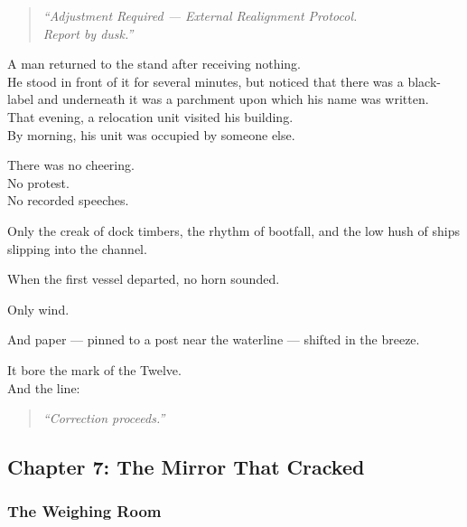 \documentclass[12pt]{article}
\begin{document}
\begin{quote}
\textit{“Adjustment Required — External Realignment Protocol.\\
Report by dusk.”}
\end{quote}

\vspace{1em}

A man returned to the stand after receiving nothing.\\

He stood in front of it for several minutes, but noticed that there was a black-label and underneath it was a parchment upon which his name was written.\\

That evening, a relocation unit visited his building.\\

By morning, his unit was occupied by someone else.

\vspace{1em}

There was no cheering.\\
No protest.\\
No recorded speeches.

Only the creak of dock timbers, the rhythm of bootfall, and the low hush of ships slipping into the channel.

\vspace{1em}

When the first vessel departed, no horn sounded.

Only wind.

And paper — pinned to a post near the waterline — shifted in the breeze.

It bore the mark of the Twelve.\\
And the line:

\begin{quote}
\textit{“Correction proceeds.”}
\end{quote}

\newpage

\subsection*{Chapter 7: The Mirror That Cracked}

\vspace{.5in}

\subsubsection*{The Weighing Room}
\end{document}
